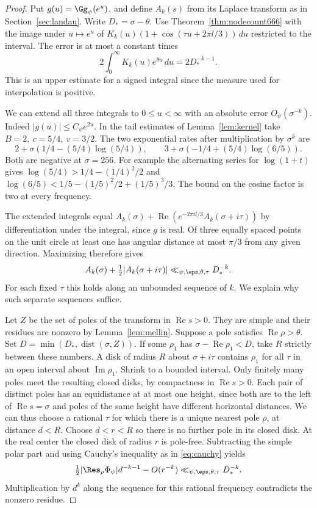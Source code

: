 \documentclass[a4paper,11pt]{article}
\theoremstyle{definition}
\theoremstyle{remark}
\newcommand{\real}{\operatorname{Re}}\newcommand{\imag}{\operatorname{Im}}
\numberwithin{equation}{section}
\begin{document}
\begin{proof}
Put \(g(u)=\Gg_\psi(e^u)\), and define \(A_k(s)\) from its Laplace
transform as in Section~\ref{sec:landau}. Write \(D_*=\sigma-\theta\).
Use Theorem~\ref{thm:nodecount666} with the image under \(u\mapsto e^u\)
of \(K_k(u)(1+\cos(\tau u+2\pi l/3))\,du\) restricted to the
interval. The error is at most a constant times
\[
 2\int_0^\infty K_k(u)e^{\theta u}\,du=2D_*^{-k-1}.
\]
This is an upper estimate for a signed integral since the measure
used for interpolation is positive.

We can extend all three integrals to \(0\le u<\infty\) with
an absolute error \(O_\psi(\sigma^{-k})\).
Indeed \(|g(u)|\le C_\psi e^{2u}\). In the tail estimates of
Lemma~\ref{lem:kernel} take \(B=2,\ c=5/4,\ v=3/2\). The
two exponential rates after multiplication by \(\sigma^k\) are
\[
   2+\sigma(1/4-(5/4)\log(5/4)),\qquad
   3+\sigma(-1/4+(5/4)\log(6/5)).
\]
Both are negative at \(\sigma=256\). For example the alternating
series for \(\log(1+t)\) gives
\(\log(5/4)>1/4-(1/4)^2/2\) and
\(\log(6/5)<1/5-(1/5)^2/2+(1/5)^3/3\).
The bound on the cosine factor is two at every frequency.

The extended integrals equal
\(A_k(\sigma)+\real(e^{-2\pi i l/3}A_k(\sigma+i\tau))\) by
differentiation under the integral, since \(g\)
is real. Of three equally spaced points on the unit circle at
least one has angular distance at most \(\pi/3\) from any given
direction. Maximizing therefore gives
\[
 A_k(\sigma)+\tfrac12|A_k(\sigma+i\tau)|
       \ll_{\psi,\eps,\theta,\tau}D_*^{-k}.
\]
For each fixed \(\tau\) this holds along an unbounded sequence of
\(k\). We explain why such separate sequences suffice.

Let \(Z\) be the set of poles of the transform in \(\real s>0\).
They are simple and their residues are nonzero by
Lemma~\ref{lem:mellin}. Suppose a pole satisfies \(\real\rho>\theta\).
Set \(D=\min(D_*,\operatorname{dist}(\sigma,Z))\).
If some \(\rho_1\) has \(\sigma-\real\rho_1<D\), take \(R\)
strictly between these numbers. A disk of radius \(R\) about
\(\sigma+i\tau\) contains \(\rho_1\) for all \(\tau\) in an open
interval about \(\imag\rho_1\). Shrink to a bounded interval.
Only finitely many poles meet the resulting closed disks, by
compactness in \(\real s>0\). Each pair of distinct poles has
an equidistance at at most one height, since both are to the
left of \(\real s=\sigma\) and poles of the same height have
different horizontal distances. We can thus choose a rational
\(\tau\) for which there is a unique nearest pole \(\rho\), at
distance \(d<R\). Choose \(d<r<R\) so there is no further pole
in its closed disk. At the real center the closed disk of radius
\(r\) is pole-free. Subtracting the simple polar part and using
Cauchy's inequality as in \eqref{eq:cauchy} yields
\[
 \tfrac12|\Res_\rho\Phi_\psi|d^{-k-1}-O(r^{-k})
     \ll_{\psi,\eps,\theta,\tau}D_*^{-k}.
\]
Multiplication by \(d^k\) along the sequence for this rational
frequency contradicts the nonzero residue.


\end{proof}
\end{document}
